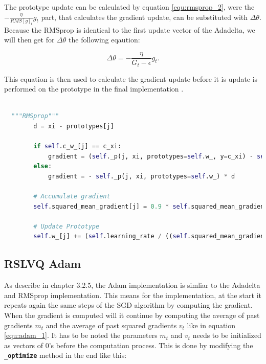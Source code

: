 \documentclass[12pt,oneside,a4paper,parskip]{scrbook}
\begin{document}
The prototype update can be calculated by equation \ref{equ:rmsprop_2}, were the $-\frac{\eta}{RMS[\textit{g}]_t} g_t$ 
part, that calculates the gradient update, can be substituted with $\Delta\theta$.
Because the RMSprop is identical to the first update vector of the Adadelta, we will then get for $\Delta\theta$ the following 
eqaution:

\begin{equation}
  \Delta\theta = - \frac{\eta}{G_t-\epsilon} \textit{g}_\textit{t}.
\end{equation}

This equation is then used to calculate the gradient update before it is update is performed on the prototype in the 
final implementation \cite{PassiveDriftonRSLVQ}.

\pagebreak

\begin{lstlisting}[label=lst:rmsprop,
  language=python,
  firstnumber=1,
  caption= Implementation of the RMSprop from \cite{PassiveDriftonRSLVQ}.]			   

  """RMSprop"""
        d = xi - prototypes[j]
                
        if self.c_w_[j] == c_xi:
            gradient = (self._p(j, xi, prototypes=self.w_, y=c_xi) - self._p(j, xi, prototypes=self.w_)) * d
        else:
            gradient = - self._p(j, xi, prototypes=self.w_) * d
            
        # Accumulate gradient
        self.squared_mean_gradient[j] = 0.9 * self.squared_mean_gradient[j] + 0.1 * gradient ** 2
        
        # Update Prototype
        self.w_[j] += (self.learning_rate / ((self.squared_mean_gradient[j] + self.epsilon) ** 0.5)) * gradient
\end{lstlisting}

\subsection{RSLVQ Adam}

As describe in chapter 3.2.5, the Adam implementation is simliar to the Adadelta and RMSprop implementation.
This means for the implementation, at the start it repeats again the same steps of the SGD algorithm by computing the gradient.
When the gradient is computed will it continue by computing the average of past  gradients $m_t$ and the average  of  past  squared  gradients $v_t$
like in equation \ref{equ:adam_1}. It has to be noted the parameters $m_t$ and $v_t$ needs to be initialized as vectors of 0's before
the computation process. This is done by modifying the \textbf{\texttt{\_optimize}} method in the end like this:
\end{document}
